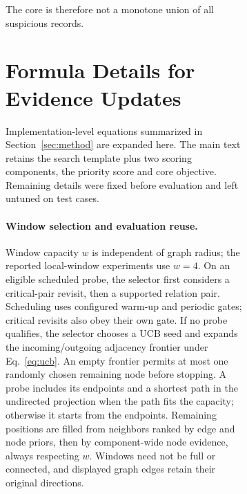 \documentclass[11pt]{article}
\begin{document}
\begin{figure}[!t]
\begin{figure}[!t]
The core is therefore not a monotone union of all suspicious records.  



\section{Formula Details for Evidence Updates}
\label{sec:appendix_formula_details}

Implementation-level equations summarized in Section~\ref{sec:method} are expanded here.  The main text retains the search template plus two scoring components, the priority score and core objective.  Remaining details were fixed before evaluation and left untuned on test cases.

\begin{revadded}
\paragraph{Window selection and evaluation reuse.}
Window capacity $w$ is independent of graph radius; the reported local-window experiments use $w=4$. On an eligible scheduled probe, the selector first considers a critical-pair revisit, then a supported relation pair. Scheduling uses configured warm-up and periodic gates; critical revisits also obey their own gate. If no probe qualifies, the selector chooses a UCB seed and expands the incoming/outgoing adjacency frontier under Eq.~\ref{eq:ucb}. An empty frontier permits at most one randomly chosen remaining node before stopping. A probe includes its endpoints and a shortest path in the undirected projection when the path fits the capacity; otherwise it starts from the endpoints. Remaining positions are filled from neighbors ranked by edge and node priors, then by component-wide node evidence, always respecting $w$. Windows need not be full or connected, and displayed graph edges retain their original directions.


\end{revadded}
\end{figure}
\end{figure}
\end{document}
